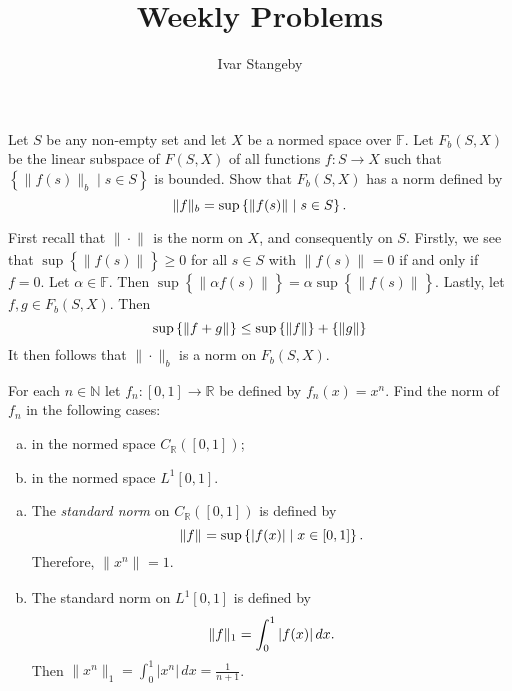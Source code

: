 \documentclass{homework}
\title{Weekly Problems}
\author{Ivar Stangeby}
\begin{document}
  \begin{problemtext}
    Let $S$ be any non-empty set and let $X$ be a normed space over $\mathbb{F}$. Let $F_b(S, X)$ be the linear subspace of $F(S, X)$ of all functions $f : S \to X$ such that $\left\{ \|f(s)\|_{b} \mid s \in S \right\}$ is bounded. Show that $F_b(S, X)$ has a norm defined by
    \begin{equation}
      \notag
      \|f\|_{b} = \sup \left\{ \|f(s)\|_{}\mid s \in S \right\}.
    \end{equation}
  \end{problemtext}

  \begin{solution}
    First recall that $\|\cdot\|_{}$ is the norm on $X$, and consequently on
    $S$.  Firstly, we see that $\sup \left\{ \|f(s)\|_{} \right\} \geq 0$ for
    all $s \in S$ with $\|f(s)\|_{} = 0$ if and only if $f = 0$.  Let $\alpha
    \in \mathbb{F}$. Then $\sup \left\{ \|\alpha f(s)\|_{} \right\} = \alpha
  \sup \left\{ \|f(s)\|_{} \right\}$. Lastly, let $f, g \in F_b(S, X)$. Then
\begin{equation} \notag \sup \left\{ \|f + g\|_{} \right\} \leq \sup \left\{
\|f\| \right\} + \left\{ \|g\| \right\} \end{equation} It then follows that
$\|\cdot\|_{b}$ is a norm on $F_b(S, X)$.
  \end{solution}

  \begin{problemtext}
    For each $n \in \mathbb{N}$ let $f_n : \left[ 0, 1 \right] \to \mathbb{R}$ be defined by $f_n(x) = x^n$. Find the norm of $f_n$ in the following cases:
    \begin{enumerate}[a)]
      \item in the normed space $C_\mathbb{R}\left( \left[ 0, 1\right] \right)$;
      \item in the normed space $L^1[0, 1]$.
    \end{enumerate}
  \end{problemtext}
  \begin{solution}\hfill
    \begin{enumerate}[a)]
      \item The \emph{standard norm} on $C_\mathbb{R}\left( \left[ 0,1 \right] \right)$ is defined by
        \begin{equation}
          \notag
          \|f\|_{} = \sup \left\{ |f(x)| \mid x \in \left[ 0, 1 \right] \right\}.
        \end{equation}
        Therefore, $\|x^n\|_{} = 1$.
      \item The standard norm on $L^1[0, 1]$ is defined by
        \begin{equation}
          \notag
          \|f\|_{1} = \int_0^1 |f(x)| \, dx.
        \end{equation}
        Then $\|x^n\|_{1} = \int_0^1 |x^n| \, dx = \frac{1}{n+1}$.
    \end{enumerate}
  \end{solution}
\end{document}
